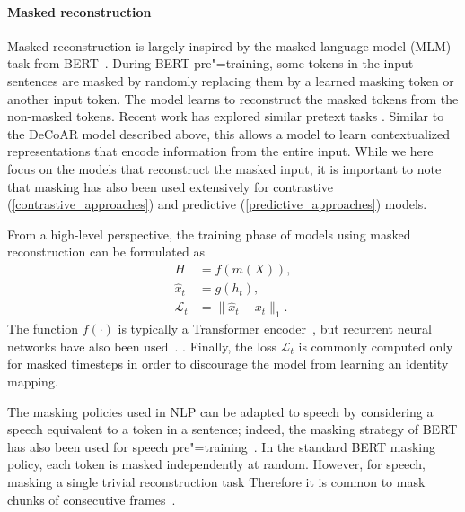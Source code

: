 \paragraph{Masked reconstruction}

Masked reconstruction is largely inspired by the masked language model (MLM) task from BERT~\parencite{devlin_bert_2018}. During BERT pre"=training, some tokens in the input sentences are masked by randomly replacing them by a learned masking token or another input token. The model learns to reconstruct the masked tokens from the non-masked tokens. Recent work has explored similar pretext tasks . Similar to the DeCoAR model described above, this allows a model to learn contextualized representations that encode information from the entire input. While we here focus on the models that reconstruct the masked input, it is important to note that masking has also been used extensively for contrastive (\cref{contrastive_approaches}) and predictive (\cref{predictive_approaches}) models. 

From a high-level perspective, the training phase of models using masked
reconstruction can be formulated as
\begin{align}
    H &= f(m(X)), \\
    \hat{x}_t &= g(h_{t}), \\
    \mathcal{L}_t &= \lVert \hat{x}_{t} - x_{t} \rVert_1 .
\end{align}
The function $f(\cdot)$ is typically a Transformer encoder~\parencite{liu_mockingjay_2020,jiang_improving_2019,liu_masked_2020}, but recurrent neural networks have also been used~\parencite{wang_unsupervised_2020}.  . Finally, the loss $\mathcal{L}_t$ is commonly computed only for masked timesteps in order to discourage the model from learning an identity mapping.

The masking policies used in NLP can be adapted to speech by considering a speech  equivalent to a token in a sentence; indeed, the masking strategy of BERT has also been used for speech pre"=training~\parencite{liu_mockingjay_2020}.
In the standard BERT masking policy, each token is masked independently at random. However, for speech, masking a single  trivial reconstruction task  Therefore it is common to mask chunks of consecutive frames~\parencite{liu_mockingjay_2020,jiang_further_2021}. 

